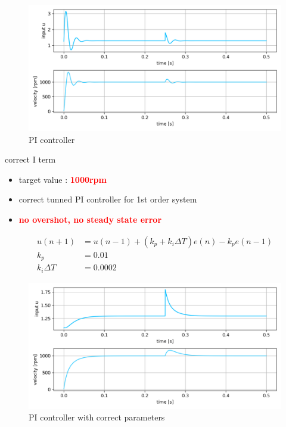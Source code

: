 \documentclass[12pt,twoside,onecolumn,openany,extrafontsizes,dvipsnames]{memoir}
\begin{document}
                    
                    \begin{figure}[!htb]
                        \centering
                        \includegraphics[scale=0.8]{../images/motor_control/pid_pi_control_0.png}
                        \caption{PI controller}
                        \label{fig:pi_controller}
                    \end{figure}

                    correct I term

                    \begin{itemize}
                        \item  target value : \textcolor{red}{\textbf {1000rpm}}
                        \item  correct tunned PI controller for 1st order system
                        \item  \textcolor{red}{\textbf {no overshot, no steady state error}}
                    \end{itemize}
                    
                    \begin{align}
                        u(n+1) &= u(n-1) + (k_p + k_i\Delta T) e(n) - k_pe(n-1) \\
                        k_p    &= 0.01 \\
                        k_i\Delta T    &= 0.0002
                    \end{align}

                    \begin{figure}[!htb]
                        \centering
                        \includegraphics[scale=0.8]{../images/motor_control/pid_pi_control_1.png}
                        \caption{PI controller with correct parameters}
                        \label{fig:pi_controller_correct}
                    \end{figure}
                    
\end{document}

